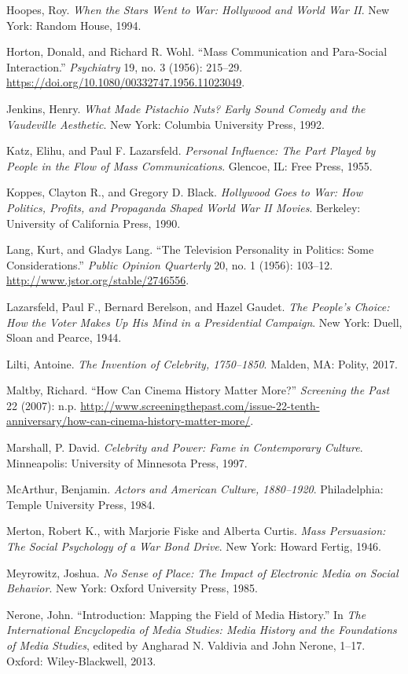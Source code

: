 \documentclass{tufte-handout}
\begin{document}
\begin{hangparas}{.25in}{1}
Hoopes, Roy. \emph{When the Stars Went to War: Hollywood and World War
II}. New York: Random House, 1994.

Horton, Donald, and Richard R. Wohl. ``Mass Communication and
Para-Social Interaction.'' \emph{Psychiatry} 19, no. 3 (1956): 215--29.
\url{https://doi.org/10.1080/00332747.1956.11023049}.

Jenkins, Henry. \emph{What Made Pistachio Nuts? Early Sound Comedy and
the Vaudeville Aesthetic}. New York: Columbia University Press, 1992.

Katz, Elihu, and Paul F. Lazarsfeld. \emph{Personal Influence: The Part
Played by People in the Flow of Mass Communications}. Glencoe, IL: Free
Press, 1955.

Koppes, Clayton R., and Gregory D. Black. \emph{Hollywood Goes to War:
How Politics, Profits, and Propaganda Shaped World War II Movies}.
Berkeley: University of California Press, 1990.

Lang, Kurt, and Gladys Lang. ``The Television Personality in Politics:
Some Considerations.'' \emph{Public Opinion Quarterly} 20, no. 1 (1956):
103--12. \url{http://www.jstor.org/stable/2746556}.

Lazarsfeld, Paul F., Bernard Berelson, and Hazel Gaudet. \emph{The
People's Choice: How the Voter Makes Up His Mind in a Presidential
Campaign}. New York: Duell, Sloan and Pearce, 1944.

Lilti, Antoine. \emph{The Invention of Celebrity, 1750--1850}. Malden,
MA: Polity, 2017.

Maltby, Richard. ``How Can Cinema History Matter More?'' \emph{Screening
the Past} 22 (2007): n.p.
\url{http://www.screeningthepast.com/issue-22-tenth-anniversary/how-can-cinema-history-matter-more/}.

Marshall, P. David. \emph{Celebrity and Power: Fame in Contemporary
Culture}. Minneapolis: University of Minnesota Press, 1997.

McArthur, Benjamin. \emph{Actors and American Culture, 1880--1920}.
Philadelphia: Temple University Press, 1984.

Merton, Robert K., with Marjorie Fiske and Alberta Curtis. \emph{Mass
Persuasion: The Social Psychology of a War Bond Drive}. New York: Howard
Fertig, 1946.

Meyrowitz, Joshua. \emph{No Sense of Place: The Impact of Electronic
Media on Social Behavior}. New York: Oxford University Press, 1985.

Nerone, John. ``Introduction: Mapping the Field of Media History.'' In
\emph{The International Encyclopedia of Media Studies: Media History and
the Foundations of Media Studies}, edited by Angharad N. Valdivia and
John Nerone, 1--17. Oxford: Wiley-Blackwell, 2013.


\end{hangparas}
\end{document}
